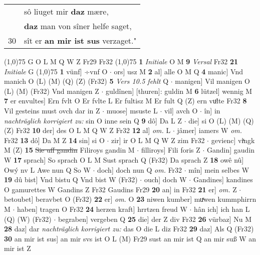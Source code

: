 \documentclass[8pt,a4paper,notitlepage]{article}
\begin{document}
\begin{table}[ht]
\begin{minipage}[t]{0.5\linewidth}
\begin{tabular}{rl}
 & sô liuget mir \textbf{daz} mære,\\ 
 & \textbf{daz} man von sîner helfe saget,\\ 
30 & sît er \textbf{an mir ist sus} verzaget."\\ 
\end{tabular}
\scriptsize
\line(1,0){75} \newline
G O L M Q W Z Fr29 Fr32 \newline
\line(1,0){75} \newline
\textbf{1} \textit{Initiale} O M  \textbf{9} \textit{Versal} Fr32  \textbf{21} \textit{Initiale} G  \newline
\line(1,0){75} \newline
\textbf{1} vünf] ÷vnf O  $\cdot$ ors] usz M \textbf{2} al] alle O M Q \textbf{4} manic] Vnd manich O (L) (M) (Q) (Z) (Fr32) \textbf{5} \textit{Vers 10.5 fehlt} Q   $\cdot$ manigen] Vil manigen O (L) (M) (Fr32) Vnd manigen Z  $\cdot$ guldînen] [thuren]: guldin M \textbf{6} lützel] wennig M \textbf{7} er envultes] Ern fvlt O Er fvlte L Er fultisz M Er fult Q (Z) ern vuͦlte Fr32 \textbf{8} Vil gesteins must ovch dar in Z  $\cdot$ muose] msuste L  $\cdot$ vil] avch O  $\cdot$ în] in \textit{nachträglich korrigiert zu:} sin O inne sein Q \textbf{9} dô] Da L Z  $\cdot$ die] si O (L) (M) (Q) (Z) Fr32 \textbf{10} der] des O L M Q W Z Fr32 \textbf{12} al] \textit{om.} L  $\cdot$ jâmer] iamers W \textit{om.} Fr32 \textbf{13} dô] Da M Z \textbf{14} sin] si O  $\cdot$ zir] ir O L M Q W Z zim Fr32  $\cdot$ gevienc] viͯngk M (Z) \textbf{15} \sout{Sie uff gandin} Filiroys gandin M  $\cdot$ filliroys] Fili foris Z  $\cdot$ Gandin] gaudin W \textbf{17} sprach] So sprach O L M Sust sprach Q (Fr32) Da sprach Z \textbf{18} owê nû] Owý nv L Awe nun Q So W  $\cdot$ doch] doch nun Q \textit{om.} Fr32  $\cdot$ mîn] mein selbes W \textbf{19} dû bist] Vnd bistu Q Vnd bist W (Fr32)  $\cdot$ ouch] doch W  $\cdot$ Gandines] kandines O gamurettes W Gandins Z Fr32 Gaudins Fr29 \textbf{20} an] in Fr32 \textbf{21} er] \textit{om.} Z  $\cdot$ betoubet] beravbet O (Fr32) \textbf{22} er] \textit{om.} O \textbf{23} niwen kumber] muͯwen kummphirrn M  $\cdot$ haben] tragen O Fr32 \textbf{24} herzen kraft] hrrtzen freud W  $\cdot$ hân ich] ich han L (Q) (W) (Fr32)  $\cdot$ begraben] vergeben Q \textbf{25} die] der Z div Fr32 \textbf{26} vürbaz] Nu M \textbf{28} daz] dar \textit{nachträglich korrigiert zu:} das O die L diz Fr32 \textbf{29} daz] Als Q (Fr32) \textbf{30} an mir ist sus] an mir svs ist O L (M) Fr29 sust an mir ist Q an mir suß W an mir ist Z \newline

\end{minipage}
\end{table}
\end{document}
